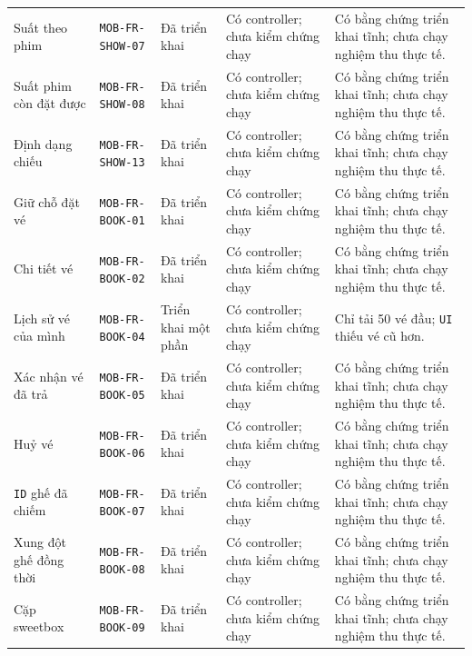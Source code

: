 \begin{longtable}{@{}P{0.19000\SRSWidth}P{0.18000\SRSWidth}P{0.15000\SRSWidth}P{0.20000\SRSWidth}P{0.28000\SRSWidth}@{}}
Suất theo phim & \texttt{MOB-\allowbreak{}FR-\allowbreak{}SHOW-\allowbreak{}07} & Đã triển khai & Có controller; chưa kiểm chứng chạy & Có bằng chứng triển khai tĩnh; chưa chạy nghiệm thu thực tế. \\[3pt]
Suất phim còn đặt được & \texttt{MOB-\allowbreak{}FR-\allowbreak{}SHOW-\allowbreak{}08} & Đã triển khai & Có controller; chưa kiểm chứng chạy & Có bằng chứng triển khai tĩnh; chưa chạy nghiệm thu thực tế. \\[3pt]
Định dạng chiếu & \texttt{MOB-\allowbreak{}FR-\allowbreak{}SHOW-\allowbreak{}13} & Đã triển khai & Có controller; chưa kiểm chứng chạy & Có bằng chứng triển khai tĩnh; chưa chạy nghiệm thu thực tế. \\[3pt]
Giữ chỗ đặt vé & \texttt{MOB-\allowbreak{}FR-\allowbreak{}BOOK-\allowbreak{}01} & Đã triển khai & Có controller; chưa kiểm chứng chạy & Có bằng chứng triển khai tĩnh; chưa chạy nghiệm thu thực tế. \\[3pt]
Chi tiết vé & \texttt{MOB-\allowbreak{}FR-\allowbreak{}BOOK-\allowbreak{}02} & Đã triển khai & Có controller; chưa kiểm chứng chạy & Có bằng chứng triển khai tĩnh; chưa chạy nghiệm thu thực tế. \\[3pt]
Lịch sử vé của mình & \texttt{MOB-\allowbreak{}FR-\allowbreak{}BOOK-\allowbreak{}04} & Triển khai một phần & Có controller; chưa kiểm chứng chạy & Chỉ tải 50 vé đầu; \texttt{UI} thiếu vé cũ hơn. \\[3pt]
Xác nhận vé đã trả & \texttt{MOB-\allowbreak{}FR-\allowbreak{}BOOK-\allowbreak{}05} & Đã triển khai & Có controller; chưa kiểm chứng chạy & Có bằng chứng triển khai tĩnh; chưa chạy nghiệm thu thực tế. \\[3pt]
Huỷ vé & \texttt{MOB-\allowbreak{}FR-\allowbreak{}BOOK-\allowbreak{}06} & Đã triển khai & Có controller; chưa kiểm chứng chạy & Có bằng chứng triển khai tĩnh; chưa chạy nghiệm thu thực tế. \\[3pt]
\texttt{ID} ghế đã chiếm & \texttt{MOB-\allowbreak{}FR-\allowbreak{}BOOK-\allowbreak{}07} & Đã triển khai & Có controller; chưa kiểm chứng chạy & Có bằng chứng triển khai tĩnh; chưa chạy nghiệm thu thực tế. \\[3pt]
Xung đột ghế đồng thời & \texttt{MOB-\allowbreak{}FR-\allowbreak{}BOOK-\allowbreak{}08} & Đã triển khai & Có controller; chưa kiểm chứng chạy & Có bằng chứng triển khai tĩnh; chưa chạy nghiệm thu thực tế. \\[3pt]
Cặp sweetbox & \texttt{MOB-\allowbreak{}FR-\allowbreak{}BOOK-\allowbreak{}09} & Đã triển khai & Có controller; chưa kiểm chứng chạy & Có bằng chứng triển khai tĩnh; chưa chạy nghiệm thu thực tế. \\[3pt]

\end{longtable}
